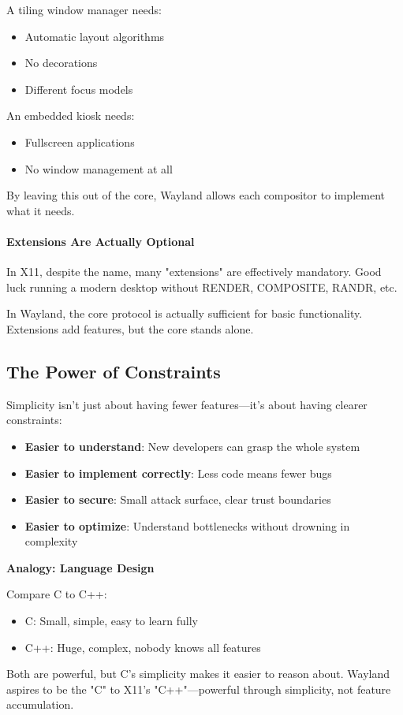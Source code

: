 A tiling window manager needs:
\begin{itemize}
    \item Automatic layout algorithms
    \item No decorations
    \item Different focus models
\end{itemize}

An embedded kiosk needs:
\begin{itemize}
    \item Fullscreen applications
    \item No window management at all
\end{itemize}

By leaving this out of the core, Wayland allows each compositor to implement what it needs.

\paragraph{Extensions Are Actually Optional}
In X11, despite the name, many "extensions" are effectively mandatory. Good luck running a modern desktop without RENDER, COMPOSITE, RANDR, etc.

In Wayland, the core protocol is actually sufficient for basic functionality. Extensions add features, but the core stands alone.

\subsection{The Power of Constraints}

Simplicity isn't just about having fewer features—it's about having clearer constraints:

\begin{itemize}
    \item \textbf{Easier to understand}: New developers can grasp the whole system
    \item \textbf{Easier to implement correctly}: Less code means fewer bugs
    \item \textbf{Easier to secure}: Small attack surface, clear trust boundaries
    \item \textbf{Easier to optimize}: Understand bottlenecks without drowning in complexity
\end{itemize}

\begin{examplebox}
\textbf{Analogy: Language Design}

Compare C to C++:
\begin{itemize}
    \item C: Small, simple, easy to learn fully
    \item C++: Huge, complex, nobody knows all features
\end{itemize}

Both are powerful, but C's simplicity makes it easier to reason about. Wayland aspires to be the "C" to X11's "C++"—powerful through simplicity, not feature accumulation.
\end{examplebox}

